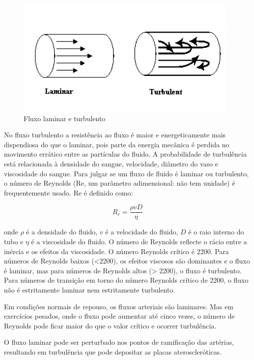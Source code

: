 \documentclass[
  portuguese,
  ]{book}
\begin{document}
\begin{figure}

{\centering \includegraphics{img/hemo_3} 

}

\caption{Fluxo laminar e turbulento}\label{fig:imghemo3}
\end{figure}

No fluxo turbulento a resistência ao fluxo é maior e energeticamente mais dispendiosa do que o laminar, pois parte da energia mecânica é perdida no movimento errático entre as partículas do fluido. A probabilidade de turbulência está relacionada à densidade do sangue, velocidade, diâmetro do vaso e viscosidade do sangue. Para julgar se um fluxo de fluido é laminar ou turbulento, o número de Reynolds (Re, um parâmetro adimensional: não tem unidade) é frequentemente usado. Re é definido como:

\begin{equation}
R_e=\frac{\rho v D}{\eta}
\label{eq:reynolds}
\end{equation}

onde \(\rho\) é a densidade do fluido, \(v\) é a velocidade do fluido, \(D\) é o raio interno do tubo e \(\eta\) é a viscosidade do fluido. O número de Reynolds reflecte o rácio entre a inércia e os efeitos da viscosidade. O número Reynolds crítico é 2200. Para números de Reynolds baixos (\textless2200), os efeitos viscosos são dominantes e o fluxo é laminar, mas para números de Reynolds altos (\textgreater{} 2200), o fluxo é turbulento. Para números de transição em torno do número Reynolds crítico de 2200, o fluxo não é estritamente laminar nem estritamente turbulento.

Em condições normais de repouso, os fluxos arteriais são laminares. Mas em exercícios pesados, onde o fluxo pode aumentar até cinco vezes, o número de Reynolds pode ficar maior do que o valor crítico e ocorrer turbulência.

O fluxo laminar pode ser perturbado nos pontos de ramificação das artérias, resultando em turbulência que pode depositar as placas ateroscleróticas.
\end{document}
